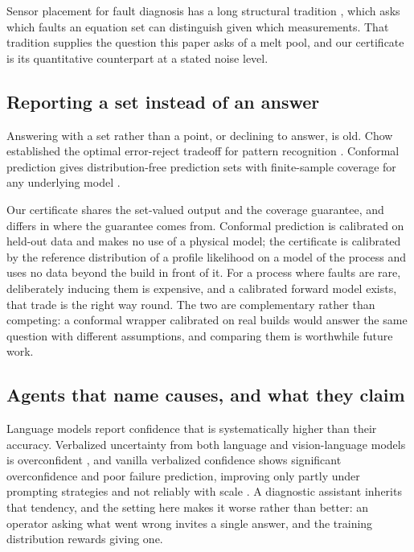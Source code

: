 \documentclass[preprint,12pt]{elsarticle}
\begin{document}
Sensor placement for fault diagnosis has a long structural tradition
\cite{Krysander2008}, which asks which faults an equation set can distinguish
given which measurements. That tradition supplies the question this paper asks
of a melt pool, and our certificate is its quantitative counterpart at a stated
noise level.

\subsection{Reporting a set instead of an answer}

Answering with a set rather than a point, or declining to answer, is old. Chow
established the optimal error-reject tradeoff for pattern recognition
\cite{Chow1970}. Conformal prediction gives distribution-free prediction sets
with finite-sample coverage for any underlying model \cite{Angelopoulos2023}.

Our certificate shares the set-valued output and the coverage guarantee, and
differs in where the guarantee comes from. Conformal prediction is calibrated on
held-out data and makes no use of a physical model; the certificate is
calibrated by the reference distribution of a profile likelihood on a model of
the process and uses no data beyond the build in front of it. For a process
where faults are rare, deliberately inducing them is expensive, and a calibrated
forward model exists, that trade is the right way round. The two are
complementary rather than competing: a conformal wrapper calibrated on real
builds would answer the same question with different assumptions, and comparing
them is worthwhile future work.

\subsection{Agents that name causes, and what they claim}

Language models report confidence that is systematically higher than their
accuracy. Verbalized uncertainty from both language and vision-language models
is overconfident \cite{Groot2024}, and vanilla verbalized confidence shows
significant overconfidence and poor failure prediction, improving only partly
under prompting strategies and not reliably with scale \cite{Xiong2023}. A
diagnostic assistant inherits that tendency, and the setting here makes it worse
rather than better: an operator asking what went wrong invites a single answer,
and the training distribution rewards giving one.
\end{document}
